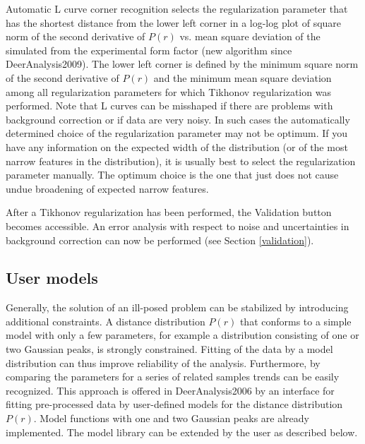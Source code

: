 \documentclass{article}
\begin{document}
Automatic L curve corner recognition selects the regularization parameter that has the shortest distance from the lower left corner in a log-log plot of square norm of the second derivative of $P(r)$ vs. mean square deviation of the simulated from the experimental form factor (new algorithm since DeerAnalysis2009). The lower left corner is defined by the minimum square norm of the second derivative of $P(r)$ and the minimum mean square deviation among all regularization parameters for which Tikhonov regularization was performed. Note that L curves can be misshaped if there are problems with background correction or if data are very noisy. In such cases the automatically determined choice of the regularization parameter may not be optimum. If you have any information on the expected width of the distribution (or of the most narrow features in the distribution), it is usually best to select the regularization parameter manually. The optimum choice is the one that just does not cause undue broadening of expected narrow features. 

After a Tikhonov regularization has been performed, the {\ttfamily Validation} button becomes accessible. An error analysis with respect to noise and uncertainties in background correction can now be performed (see Section \ref{validation}).

\subsection{User models}
Generally, the solution of an ill-posed problem can be stabilized by introducing additional constraints. A distance distribution $P(r)$ that conforms to a simple model with only a few parameters, for example a distribution consisting of one or two Gaussian peaks, is strongly constrained. Fitting of the data by a model distribution can thus improve reliability of the analysis. Furthermore, by comparing the parameters for a series of related samples trends can be easily recognized. This approach is offered in DeerAnalysis2006 by an interface for fitting pre-processed data by user-defined models for the distance distribution $P(r)$. Model functions with one and two Gaussian peaks are already implemented. The model library can be extended by the user as described below.
\end{document}
